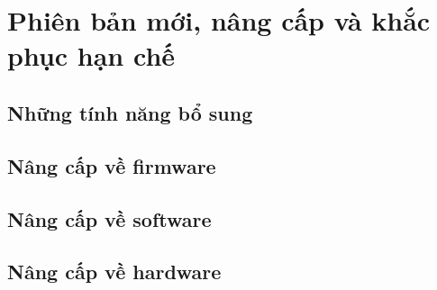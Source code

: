 \section{Phiên bản mới, nâng cấp và khắc phục hạn chế}
    \subsection{Những tính năng bổ sung}
    \subsection{Nâng cấp về firmware}
    \subsection{Nâng cấp về software}
    \subsection{Nâng cấp về hardware}